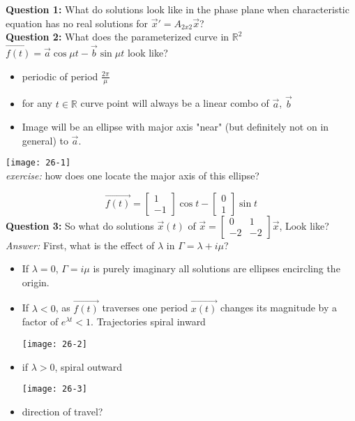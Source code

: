 \textbf{Question 1:} What do solutions look like in the phase plane when characteristic equation has no real solutions for $\vec{x}' = A_{2x2} \vec{x}$?\\
\textbf{Question 2:} What does the parameterized curve in $\mathbb{R}^2$ $\vec{f(t)} = \vec{a} \cos \mu t - \vec{b} \sin \mu t$ look like?
\begin{itemize}
	\item periodic of period $\frac{2 \pi}{\mu}$
	\item for any $t \in \mathbb{R}$ curve point will always be a linear combo of $\vec{a}$, $\vec{b}$
	\item Image will be an ellipse with major axis "near" (but definitely not on in general) to $\vec{a}$.
\end{itemize}
\begin{center}
	\texttt{[image: 26-1]}\\
	{\small \textit{exercise:} how does one locate the major axis of this ellipse?}
\end{center}
\begin{equation*}
	\vec{f(t)} = \begin{bmatrix}
		1\\-1
	\end{bmatrix} \cos t -
	\begin{bmatrix}
		0\\1
	\end{bmatrix}\sin t
\end{equation*}
\textbf{Question 3:} So what do solutions $\vec{x}(t)$ of $\vec{x} = \begin{bmatrix}
	0 & 1\\ -2 & -2
\end{bmatrix} \vec{x}$, Look like?\\
\emph{Answer:} First, what is the effect of $\lambda$ in $\Gamma = \lambda + i \mu$?
\begin{itemize}
	\item If $\lambda = 0$, $\Gamma = i\mu$ is purely imaginary all solutions are ellipses encircling the origin. 
	\item If $\lambda < 0$, as $\vec{f(t)}$ traverses one period $\vec{x(t)}$ changes its magnitude by a factor of $e^{\lambda t} < 1$. Trajectories spiral inward
	\begin{center}
		\texttt{[image: 26-2]}
	\end{center}
	\item if $\lambda > 0$, spiral outward
	\begin{center}
		\texttt{[image: 26-3]}
	\end{center}
	\item direction of travel?
\end{itemize}
